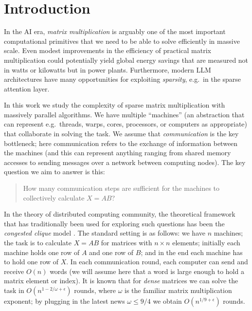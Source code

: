\section{Introduction} \label{sec:intro}

In the AI era, \emph{matrix multiplication} is arguably one of the most important computational primitives that we need to be able to solve efficiently in massive scale. Even modest improvements in the efficiency of practical matrix multiplication could potentially yield global energy savings that are measured not in watts or kilowatts but in power plants. Furthermore, modern LLM architectures have many opportunities for exploiting \emph{sparsity}, e.g.\ in the sparse attention layer.

In this work we study the complexity of sparse matrix multiplication with massively parallel algorithms. We have multiple ``machines'' (an abstraction that can represent e.g.\ threads, warps, cores, processors, or computers as appropriate) that collaborate in solving the task. We assume that \emph{communication} is the key bottleneck; here communication refers to the exchange of information between the machines (and this can represent anything ranging from shared memory accesses to sending messages over a network between computing nodes). The key question we aim to answer is this:
\begin{quote}
How many communication steps are sufficient for the machines to collectively calculate $X = AB$?
\end{quote}

In the theory of distributed computing community, the theoretical framework that has traditionally been used for exploring such questions has been the \emph{congested clique} model \cite{censor-hillel-kaski-etal-2019-algebraic-methods-in-the}. The standard setting is as follows: we have $n$ machines; the task is to calculate $X = AB$ for matrices with $n \times n$ elements; initially each machine holds one row of $A$ and one row of $B$; and in the end each machine has to hold one row of $X$. In each communication round, each computer can send and receive $O(n)$ words (we will assume here that a word is large enough to hold a matrix element or index). It is known that for \emph{dense} matrices we can solve the task in $O(n^{1-2/\omega+\epsilon})$ rounds, where $\omega$ is the familiar matrix multiplication exponent; by plugging in the latest news $\omega \le 9/4$ \cite{openai-2026-an-upper-bound-of-9-4-for-the-matrix,amanov-van-den-berg-zuiddam-2026-multiplying-matrices-via-polynomials} we obtain $O(n^{1/9+\epsilon})$ rounds.

